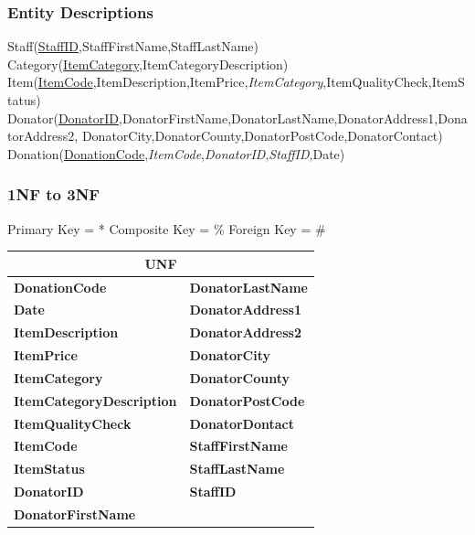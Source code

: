 \subsubsection{Entity Descriptions}

Staff(\underline{StaffID},StaffFirstName,StaffLastName)
Category(\underline{ItemCategory},ItemCategoryDescription)
Item(\underline{ItemCode},ItemDescription,ItemPrice,\textit{ItemCategory},ItemQualityCheck,ItemStatus)
Donator(\underline{DonatorID},DonatorFirstName,DonatorLastName,DonatorAddress1,DonatorAddress2,
		DonatorCity,DonatorCounty,DonatorPostCode,DonatorContact)
Donation(\underline{DonationCode},\textit{ItemCode},\textit{DonatorID},\textit{StaffID},Date)

\subsubsection{1NF to 3NF}

Primary Key 		= *
Composite Key	= \%
Foreign Key		= \# 
\begin{center}
    \begin{tabular}{|p{4.5cm}|p{4.5cm}|}
	\hline
	\multicolumn{2}{|c|}{UNF} \\
	\hline
	\textbf{DonationCode} & \textbf{DonatorLastName} \\ \hline
	\textbf{Date} & \textbf{DonatorAddress1} \\ \hline
	\textbf{ItemDescription} & \textbf{DonatorAddress2} \\ \hline
	\textbf{ItemPrice} & \textbf{DonatorCity} \\ \hline
	\textbf{ItemCategory} & \textbf{DonatorCounty} \\ \hline
	\textbf{ItemCategoryDescription} & \textbf{DonatorPostCode} \\ \hline
	\textbf{ItemQualityCheck} & \textbf{DonatorDontact} \\ \hline
	\textbf{ItemCode} & \textbf{StaffFirstName} \\ \hline
	\textbf{ItemStatus} & \textbf{StaffLastName} \\ \hline
	\textbf{DonatorID} & \textbf{StaffID} \\ \hline
	\textbf{DonatorFirstName} & \textbf{}\\ \hline
    \end{tabular}
\end{center}
	
